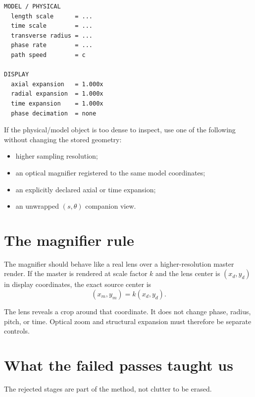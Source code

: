\documentclass[aps,preprint,onecolumn,nofootinbib]{revtex4-2}
\begin{document}
\begin{verbatim}
MODEL / PHYSICAL
  length scale      = ...
  time scale        = ...
  transverse radius = ...
  phase rate        = ...
  path speed        = c

DISPLAY
  axial expansion   = 1.000x
  radial expansion  = 1.000x
  time expansion    = 1.000x
  phase decimation  = none
\end{verbatim}

If the physical/model object is too dense to inspect, use one of the following without changing the stored geometry:
\begin{itemize}
\item higher sampling resolution;
\item an optical magnifier registered to the same model coordinates;
\item an explicitly declared axial or time expansion;
\item an unwrapped $(s,\theta)$ companion view.
\end{itemize}

\section{The magnifier rule}

The magnifier should behave like a real lens over a higher-resolution master render. If the master is rendered at scale factor $k$ and the lens center is $(x_d,y_d)$ in display coordinates, the exact source center is
\begin{equation}
(x_m,y_m)=k(x_d,y_d).
\end{equation}

The lens reveals a crop around that coordinate. It does not change phase, radius, pitch, or time. Optical zoom and structural expansion must therefore be separate controls.

\section{What the failed passes taught us}

The rejected stages are part of the method, not clutter to be erased.
\end{document}

